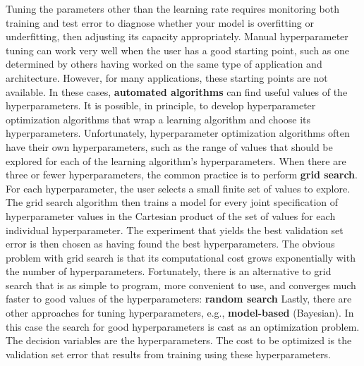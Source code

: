 Tuning the parameters other than the learning rate requires monitoring both
training and test error to diagnose whether your model is overfitting or underfitting, then adjusting its capacity appropriately.\newline\newline
Manual hyperparameter tuning can work very well when the user has a good starting point, such as one determined by others having worked on the same type of application and architecture. However, for many applications, these starting points are not available. In these cases, \textbf{automated algorithms} can find useful values of the hyperparameters. It is possible, in principle, to develop hyperparameter optimization algorithms that wrap a learning algorithm and choose its hyperparameters. Unfortunately, hyperparameter optimization algorithms often have their own hyperparameters, such as the range of values that
should be explored for each of the learning algorithm’s hyperparameters.\newline\newline
When there are three or fewer hyperparameters, the common practice is to perform \textbf{grid search}. For each hyperparameter, the user selects a small finite set of values to explore. The grid search algorithm then trains a model for every joint specification of hyperparameter values in the Cartesian product of the set of values for each individual hyperparameter. The experiment that yields the best validation set error is then chosen as having found the best hyperparameters. The obvious problem with grid search is that its computational cost grows
exponentially with the number of hyperparameters.\newline\newline
Fortunately, there is an alternative to grid search that is as simple to program, more convenient to use, and converges much faster to good values of the hyperparameters: \textbf{random search}\newline\newline
Lastly, there are other approaches for tuning hyperparameters, e.g.,  \textbf{model-based} (Bayesian). In this case the search for good hyperparameters is cast as an optimization problem. The decision variables are the hyperparameters. The cost to be optimized is the validation set error that results from training using these hyperparameters.

